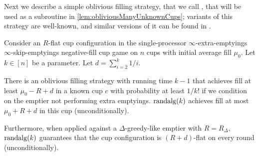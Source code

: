 
Next we describe a simple oblivious filling strategy, that we
call , that will be used as a subroutine in
\cref{lem:obliviousManyUnknownCups}; variants of this strategy
are well-known, and similar versions of it can be found in \cite{
mbe19, mbe15, die91, wku20}.
\begin{proposition}
  \label{prop:obliviousTerribleProbability}
  Consider an $R$-flat cup configuration in the single-processor
  $\infty$-extra-emptyings $\infty$-skip-emptyings negative-fill cup
  game on $n$ cups with initial average fill $\mu_0$.
  Let $k \in [n]$ be a parameter. Let $d = \sum_{i=2}^k 1/i$.

  There is an oblivious filling strategy 
  with running time $k-1$ that achieves fill at least $\mu_0 -R +
  d$ in a known cup $c$ with probability at least $1/k!$ if
  we condition on the emptier not performing extra emptyings.
  $\operatorname{\text{\textup{randalg}}}(k)$ achieves fill at most $\mu_0 + R + d$ in this cup
  (unconditionally).

  Furthermore, when applied against a $\Delta$-greedy-like emptier
  with $R = R_\Delta$, $\operatorname{\text{\textup{randalg}}}(k)$ guarantees that
  the cup configuration is $(R + d)$-flat on every round
  (unconditionally).
\end{proposition}
